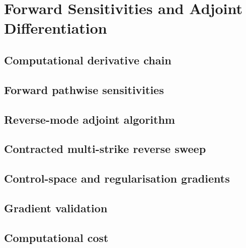 \chapter{Forward Sensitivities and Adjoint Differentiation}
\label{ch:adjoints}

\section{Computational derivative chain}
\label{sec:aad-chain}

\section{Forward pathwise sensitivities}
\label{sec:aad-forward}

\section{Reverse-mode adjoint algorithm}
\label{sec:aad-reverse}

\section{Contracted multi-strike reverse sweep}
\label{sec:aad-contracted}

\section{Control-space and regularisation gradients}
\label{sec:aad-control}

\section{Gradient validation}
\label{sec:aad-validation}

\section{Computational cost}
\label{sec:aad-cost}
